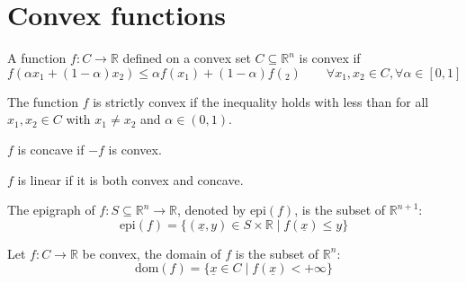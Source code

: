 \section{Convex functions}

\begin{definition}
    A function $f : C \rightarrow\mathbb{R}$ defined on a convex set $C \subseteq \mathbb{R}^n$ is convex if
    \[f (\alpha x_1 + (1-\alpha )x_2) \leq \alpha f (x_1) + (1-\alpha )f (_2) \qquad\forall x_1,x_2 \in C,\forall\alpha \in[0,1]\]
\end{definition}
\begin{definition}
    The function $f$ is strictly convex if the inequality holds with less than for all $x_1,x_2 \in C$ with $x_1 \neq x_2$ and $\alpha\in(0,1)$.
\end{definition}
\begin{definition}
    $f$ is concave if $-f$ is convex.
\end{definition}
\begin{definition}
    $f$ is linear if it is both convex and concave.
\end{definition}
\begin{definition}
    The epigraph of $f : S \subseteq \mathbb{R}^n \rightarrow \mathbb{R}$, denoted by $\text{epi}(f)$, is the subset of $\mathbb{R}^{n+1}$:
    \[\text{epi}(f) = \{(\underline{x},y) \in S \times \mathbb{R} \mid f(\underline{x}) \leq y\}\]
\end{definition}
\begin{definition}
    Let $f : C \rightarrow\mathbb{R}$ be convex, the domain of $f$ is the subset of $\mathbb{R}^n$:
    \[\text{dom}(f) = \{\underline{x} \in C \mid f (\underline{x}) <+\infty\}\]
\end{definition}

